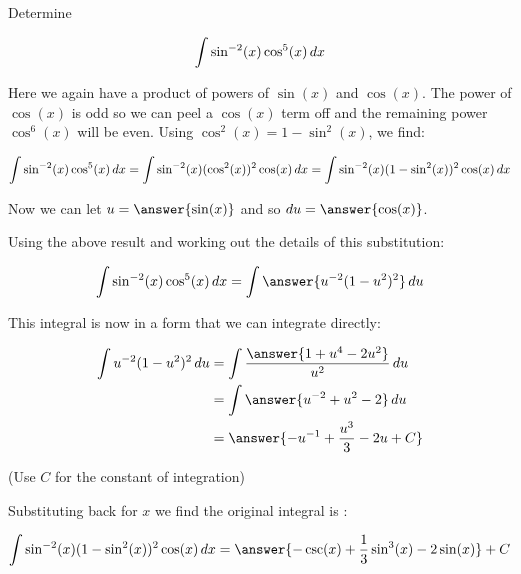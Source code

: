 \documentclass{ximera}
\author{Jason Miller and Bart Snapp}
\begin{document}
\begin{exercise}
Determine 

\[
\int \sin^{-2}(x)\cos^{5}(x) \mathop{}\!d x
\]

Here we again have a product of powers of $\sin(x)$ and $\cos(x)$. The power of $\cos(x)$ is odd so we can peel a $\cos(x)$ term off and the remaining power $\cos^{6}(x)$ will be even. Using $\cos^{2}(x)=1-\sin^{2}(x)$, we find:

\[
\int \sin^{-2}(x)\cos^{5}(x) \mathop{}\!d x = \int \sin^{-2}(x) (\cos^2(x))^{2} \cos(x) \mathop{}\!d x =\int \sin^{-2}(x) (1-\sin^{2}(x))^{2} \cos(x) \mathop{}\!d x 
\]

Now we can let $u=\answer{\sin(x)}$ and so $\d u= \answer{\cos(x)}$. 

\begin{exercise}
Using the above result and working out the details of this substitution:

\[
\int \sin^{-2}(x)\cos^{5}(x) \d x = \int \answer{u^{-2}(1-u^{2})^{2}} \d u
\]

\begin{exercise}
This integral is now in a form that we can integrate directly: 

\begin{align*}
\int u^{-2}(1-u^{2})^{2} \d u &=\int \frac{\answer{1+u^{4}-2u^{2}}}{u^{2}} \d u \\
&= \int \answer{u^{-2}+u^{2} -2} \d u \\
&=\answer{-u^{-1}+\frac{u^{3}}{3} -2u + C}
\end{align*}

(Use $C$ for the constant of integration)
\begin{exercise}

Substituting back for $x$ we find the original integral is :

\[
\int \sin^{-2}(x) ( 1- \sin^{2}(x))^{2} \cos(x) \d x= \answer{-\csc(x)+ \frac{1}{3} \sin^{3}(x) -2 \sin(x)} +C
\]

\end{exercise}
\end{exercise}
\end{exercise}
\end{exercise}
\end{document}
